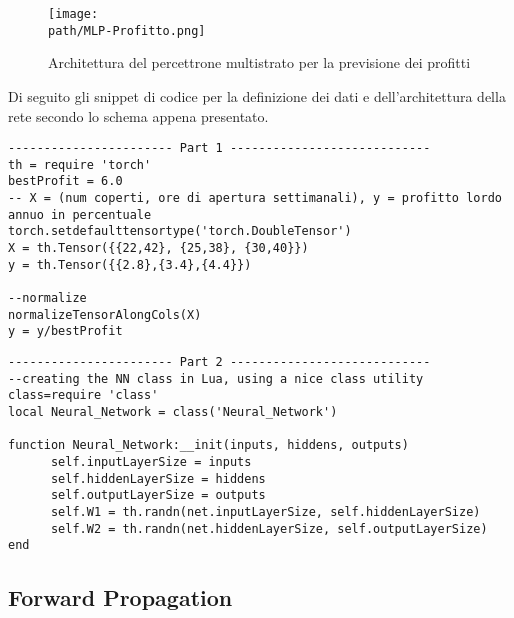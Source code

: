 \begin{figure}[h!]
 \centering
 \texttt{[image: \\path/MLP-Profitto.png]}
 \caption{Architettura del percettrone multistrato per la previsione dei profitti}
 \label{fig:mlp}
\end{figure}

Di seguito gli snippet di codice per la definizione dei dati e dell'architettura della rete secondo lo schema appena presentato. 

\begin{lstlisting}[language={[5.2]Lua}]
----------------------- Part 1 ----------------------------
th = require 'torch'
bestProfit = 6.0
-- X = (num coperti, ore di apertura settimanali), y = profitto lordo annuo in percentuale
torch.setdefaulttensortype('torch.DoubleTensor')
X = th.Tensor({{22,42}, {25,38}, {30,40}})
y = th.Tensor({{2.8},{3.4},{4.4}})

--normalize
normalizeTensorAlongCols(X)
y = y/bestProfit

\end{lstlisting}

\begin{lstlisting}[language={[5.2]Lua}]
----------------------- Part 2 ----------------------------
--creating the NN class in Lua, using a nice class utility
class=require 'class'
local Neural_Network = class('Neural_Network')

function Neural_Network:__init(inputs, hiddens, outputs)
      self.inputLayerSize = inputs
      self.hiddenLayerSize = hiddens
      self.outputLayerSize = outputs
      self.W1 = th.randn(net.inputLayerSize, self.hiddenLayerSize)
      self.W2 = th.randn(net.hiddenLayerSize, self.outputLayerSize)
end
\end{lstlisting}

\subsection{Forward Propagation}

